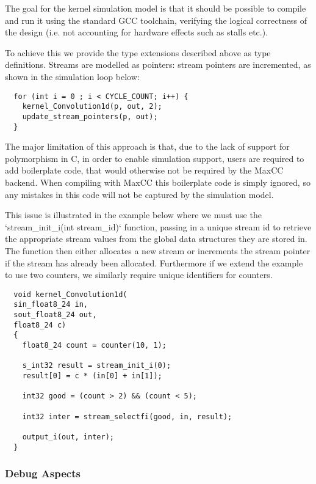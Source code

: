 The goal for the kernel simulation model is that it should be
possible to compile and run it using the standard GCC
toolchain, verifying the logical correctness of the design
(i.e. not accounting for hardware effects such as stalls
etc.).

To achieve this we provide the type extensions described above
as type definitions. Streams are modelled as pointers:
stream pointers are incremented, as shown in the simulation
loop below:

\lstset{style=MaxC}

\begin{lstlisting}
  for (int i = 0 ; i < CYCLE_COUNT; i++) {
    kernel_Convolution1d(p, out, 2);
    update_stream_pointers(p, out);
  }
\end{lstlisting}

The major limitation of this approach is that, due to the lack of
support for polymorphism in C, in order to enable simulation support,
users are required to add boilerplate code, that would otherwise not
be required by the MaxCC backend. When compiling with MaxCC this
boilerplate code is simply ignored, so any mistakes in this code will
not be captured by the simulation model.

This issue is illustrated in the example below where we must use the
`stream\_init\_i(int stream\_id)` function, passing in a unique stream id
to retrieve the appropriate stream values from the global data
structures they are stored in. The function then either allocates a
new stream or increments the stream pointer if the stream has already
been allocated. Furthermore if we extend the example to use two
counters, we similarly require unique identifiers for counters.

\begin{lstlisting}
  void kernel_Convolution1d(
  sin_float8_24 in,
  sout_float8_24 out,
  float8_24 c)
  {
    float8_24 count = counter(10, 1);

    s_int32 result = stream_init_i(0);
    result[0] = c * (in[0] + in[1]);

    int32 good = (count > 2) && (count < 5);

    int32 inter = stream_selectfi(good, in, result);

    output_i(out, inter);
  }

\end{lstlisting}

\subsubsection{Debug Aspects}

